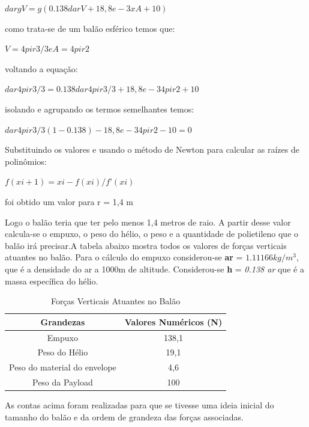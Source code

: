 	$dar g V = g(0.138dar  V + 18,8e-3 x A + 10)$

	como trata-se de um balão esférico temos que: 

	$V = 4pi r3/3 e A = 4pi r2$

	voltando a equação:

	$dar 4pi r3/3 = 0.138dar4pi r3/3 + 18,8e-3 4pi r2 +10$ 

	isolando e agrupando os termos semelhantes temos:

	$dar 4pi r3/3 (1 - 0.138) - 18,8e-3 4pi r2 -10 = 0$

	Substituindo os valores e usando o método de Newton para calcular as raízes de polinômios:

	$f(xi+1) = xi - f(xi) / f ’ (xi)	$

	foi obtido um valor para r = 1,4 m

	 Logo o balão teria que ter pelo menos 1,4 metros de raio. A partir desse valor calcula-se o empuxo, o peso do hélio, o peso e a quantidade de polietileno que o balão irá precisar.A tabela abaixo mostra todos os valores de forças verticais atuantes no balão. Para o cálculo do empuxo considerou-se \textbf{ar}  = $1.11166 kg/m^3$, que é a densidade do ar a 1000m de altitude. Considerou-se \textbf{h} = \textit{0.138 ar} que é a massa específica do hélio.

	 \begin{table}[H]
		\centering
		\begin{tabular}{|c|c|}
			\hline
			\rowcolor[HTML]{FFFFFF} 
			{\color[HTML]{000000} \textbf{Grandezas}} & {\color[HTML]{000000} \textbf{Valores Numéricos (N)}} \\ \hline
			Empuxo                                    & 138,1                                                 \\ \hline
			Peso do Hélio                             & 19,1                                                  \\ \hline
			Peso do material do envelope              & 4,6                                                   \\ \hline
			Peso da Payload                           & 100                                                   \\ \hline
		\end{tabular}
		\caption{Forças Verticais Atuantes no Balão}
		\label{tab:forcasVerticaisAtuantes}
	\end{table}


As contas acima foram realizadas para que se tivesse uma ideia inicial do tamanho do balão e da ordem de grandeza das forças associadas.

